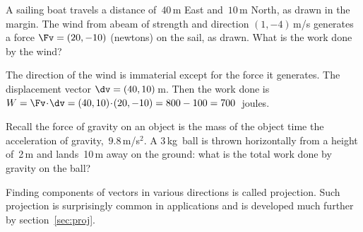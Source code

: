 \begin{example} \label{eg:}
A sailing boat travels a distance of~\(40\)\,m East and~\(10\)\,m North, as drawn in the margin.
%
The wind from abeam of strength and direction \((1,-4)\)\,m/s generates a force \(\Fv=(20,-10)\) (newtons) on the sail, as drawn.
What is the work done by the wind?
\begin{solution} 
The direction of the wind is immaterial except for the force it generates.
The displacement vector \(\dv=(40,10)\)\,m.
Then the work done is \(W=\Fv\cdot\dv =(40,10)\cdot(20,-10) =800-100 =700\)~joules.
\end{solution}
\end{example}



\begin{activity}
Recall the force of gravity on an object is the mass of the object time the acceleration of gravity,~\(9.8\)\,m/s\({}^2\).
A 3\,kg~ball is thrown horizontally from a height of~2\,m and lands~10\,m away on the ground: what is the total work done by gravity on the ball?
\end{activity}


Finding components of vectors in various directions is called projection. 
Such projection is surprisingly common in applications and is developed much further by section~\ref{sec:proj}.







